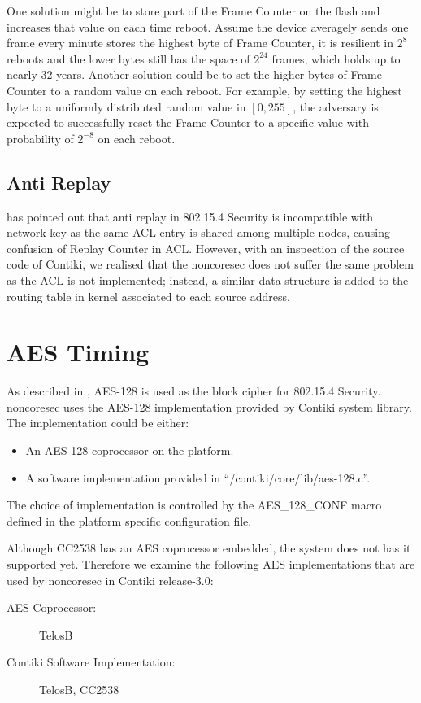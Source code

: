 One solution might be to store part of the Frame Counter on the flash and increases that value on each time reboot. Assume the device averagely sends one frame every minute stores the highest byte of Frame Counter, it is resilient in $2^8$ reboots and the lower bytes still has the space of $2^{24}$ frames, which holds up to nearly 32 years. Another solution could be to set the higher bytes of Frame Counter to a random value on each reboot. For example, by setting the highest byte to a uniformly distributed random value in $[0,255]$, the adversary is expected to successfully reset the Frame Counter to a specific value with probability of $2^{-8}$ on each reboot.

\subsection{Anti Replay}

\cite{802154sec} has pointed out that anti replay in 802.15.4 Security is incompatible with network key as the same ACL entry is shared among multiple nodes, causing confusion of Replay Counter in ACL. However, with an inspection of the source code of Contiki, we realised that the noncoresec does not suffer the same problem as the ACL is not implemented; instead, a similar data structure is added to the routing table in kernel  associated to each source address.

\section{AES Timing} \label{Sec: AES Timing}

As described in , AES-128 is used as the block cipher for 802.15.4 Security. noncoresec uses the AES-128 implementation provided by Contiki system library. The implementation could be either:
\begin{itemize}
	\item An AES-128 coprocessor on the platform.
	\item A software implementation provided in ``/contiki/core/lib/aes-128.c''.
\end{itemize}

The choice of implementation is controlled by the AES\_128\_CONF macro defined in the platform specific configuration file.

Although CC2538 has an AES coprocessor embedded,  the system does not has it supported yet. Therefore we examine the following AES implementations that are used by noncoresec in Contiki release-3.0:
\begin{description}
	\item[AES Coprocessor:] TelosB
	\item[Contiki Software Implementation:] TelosB, CC2538
\end{description}

